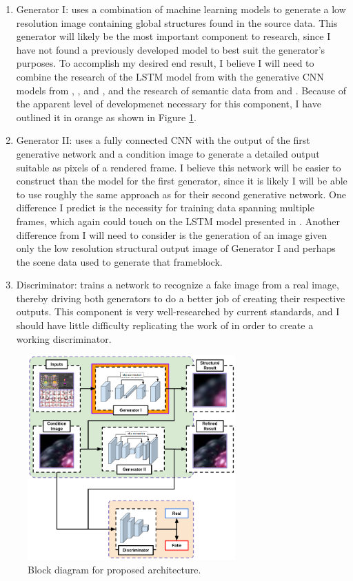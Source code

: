 \documentclass[conference]{IEEEtran}
\begin{document}
\begin{enumerate}
\item Generator I: uses a combination of machine learning models to generate a
low resolution image containing global structures found in the
source data. This generator will likely be the most important component to
research, since I have not found a previously developed model to best suit the
generator's purposes. To accomplish my desired end result,
I believe I will need to combine the research of the LSTM
model from \cite{ref:frame_prediction} with the
generative CNN models from \cite{ref:pixelcnn_decoders}, \cite{ref:pixelcnn++},
and \cite{ref:multi_source}, and the research of semantic data from
\cite{ref:image_captioning} and \cite{ref:posecnn}. Because of the apparent
level of developmenet necessary for this component, I have
outlined it in orange as shown in Figure \ref{fig:block_diagram}.
\item Generator II: uses a fully connected CNN with the output of the first generative network and a
condition image to generate a detailed output suitable as pixels of a rendered
frame. I believe this network will be easier to construct than the model for the
first generator, since it is likely I will be able to use roughly the same approach as
\cite{ref:pose_guided} for their second generative network. One difference I
predict is the necessity for training data spanning multiple frames, which again
could touch on the LSTM model presented in \cite{ref:frame_prediction}.
Another difference from \cite{ref:pose_guided} I will need to consider is the generation of an image given
only the low resolution structural output image of Generator I and perhaps the scene data
used to generate that frameblock.
\item Discriminator: trains a network to recognize a fake image from a real
image, thereby driving both generators to do a better job of creating their
respective outputs. This component is very well-researched by current standards,
and I should have little difficulty replicating the work of
\cite{ref:pose_guided} in order to create a working discriminator.
\end{enumerate}

\begin{figure}[htbp]
\centerline{\includegraphics[width=8cm]{block_diagram.png}}
\caption{Block diagram for proposed architecture.}
\label{fig:block_diagram}
\end{figure}
\end{document}
